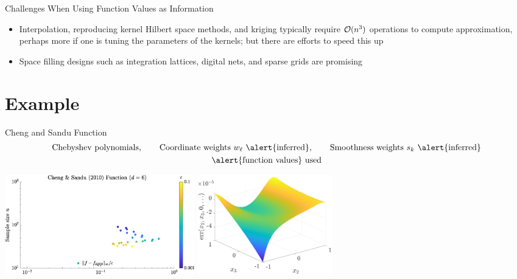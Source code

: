 \documentclass[10pt,compress,xcolor={usenames,dvipsnames},aspectratio=169]{beamer}
\begin{document}
\begin{frame}{Challenges When Using Function Values as Information}
\begin{itemize}
\begin{itemize}
        \item Interpolation, reproducing kernel Hilbert space methods, and kriging typically require $\operatorname{{\mathcal O}}(n^3)$ operations to compute approximation, perhaps more if one is tuning the parameters of the kernels; but there are efforts to speed this up
        
        \item Space filling designs such as integration lattices, digital nets, and sparse grids are promising
    \end{itemize}
     
\end{itemize}
\end{frame}



\section{Example}

\begin{frame}{Cheng and Sandu Function}
    \vspace{-9ex}
    \begin{gather*}
        \text{Chebyshev polynomials}, \qquad \text{Coordinate weights } w_\ell \text{ \alert{inferred}}, \qquad
        \text{Smoothness weights } s_k \text{ \alert{inferred}} \\
        \text{\alert{function values} used}
    \end{gather*}
    
    \vspace{-3ex}
    
    \includegraphics[height = 4.3cm]{ProgramsImages/sim_eval_results_chsan10_d6_sflg0ErrN.eps}
    \qquad \includegraphics[height = 4.3cm]{ProgramsImages/sim_eval_results_chsan10_d6_sflg0fErr.eps}
\end{frame}
\end{document}
